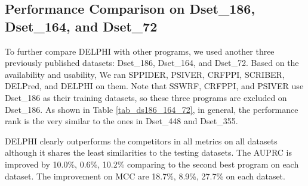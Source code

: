 \subsection{Performance Comparison on Dset\_186, Dset\_164, and Dset\_72}
To further compare DELPHI with other programs, we used another three previously published datasets: Dset\_186, Dset\_164, and Dset\_72. Based on the availability and usability, We ran SPPIDER, PSIVER, CRFPPI, SCRIBER, DELPred, and DELPHI on them. Note that SSWRF, CRFPPI, and PSIVER use Dset\_186 as their training datasets, so these three programs are excluded on Dset\_186. As shown in Table \ref{tab_ds186_164_72}, in general, the performance rank is the very similar to the ones in Dset\_448 and Dset\_355.

DELPHI clearly outperforms the competitors in all metrics on all datasets although it shares the least similarities to the testing datasets.  The AUPRC is improved by 10.0\%, 0.6\%, 10.2\% comparing to the second best program on each dataset. The improvement on MCC are 18.7\%, 8.9\%, 27.7\% on each dataset. 
